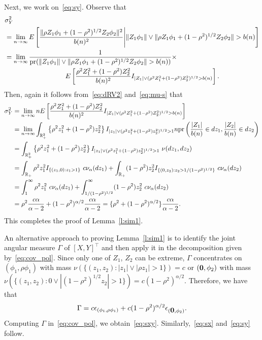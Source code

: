 \documentclass[lineno]{biometrika}
\newcommand \ag{\alpha}
\newcommand \Gg{\Gamma}
\newcommand \ep{\epsilon}
\newcommand \sg{\sigma}
\newcommand\bzero{\mbox{\boldmath${0}$}}
\newcommand\mbR{{\mathbb R}}
\newcommand\lp{\left (}
\newcommand\rp{\right )}
\newcommand\lb{\left [}
\newcommand\rb{\right ]}
\newcommand\lbr{\left \{}
\newcommand\rbr{\right \}}
\begin{document}
Next, we work on~\eqref{eq:sy}. Observe that
\begin{align*}
&\sg_{Y}^2 \\
&= \lim_{n \to \infty} E \lb   \frac{\|\rho Z_1 \phi_1+(1-\rho^2)^{1/2} Z_2 \phi_2 \|^2}{b(n)^2}  \Bigg| \| Z_1 \phi_1 \|  \vee  \| \rho Z_1 \phi_1+(1-\rho^2)^{1/2} Z_2 \phi_2 \| > b(n)\rb  \\
&= \lim_{n \to \infty} \frac{1}{{\rm pr}(\| Z_1 \phi_1 \|  \vee  \| \rho Z_1 \phi_1+(1-\rho^2)^{1/2} Z_2 \phi_2 \| > b(n))} \times \\
&\ \ \ \ \ \ \ \ \ \ \ \ \ \ \ \ \ \ \ \ \ \ \ \ \ \ \ E \lb  \frac{\rho^2 Z_1^2 +(1-\rho^2) Z_2^2 }{b(n)^2} I_{|Z_1| \vee (\rho^2 Z_1^2 +(1-\rho^2)Z_2^2 )^{1/2} > b(n)} \rb.
\end{align*}
Then, again it follows from~\eqref{eq:dRV2} and~\eqref{eq:mu-s} that
\begin{align*}
\sg_{Y}^2 &= \lim_{n \to \infty} nE \lb  \frac{\rho^2 Z_1^2 +(1-\rho^2) Z_2^2 }{b(n)^2} I_{|Z_1| \vee (\rho^2 Z_1^2 +(1-\rho^2)Z_2^2 )^{1/2} > b(n)} \rb   \\
&= \lim_{n \to \infty} \int_{\mbR^2_+} \lbr \rho^2 z_1^2 + (1-\rho^2)z_2^2 \rbr I_{ |z_1| \vee ( \rho^2 z_1^2 + (1-\rho^2) z_2^2 )^{1/2} >1} n{\rm pr}\lp \frac{|Z_1|}{b(n)} \in dz_1, \frac{|Z_2|}{b(n)}\in dz_2 \rp \\
&= \int_{\mbR_+^2}  \lbr \rho^2 z_1^2 + (1-\rho^2)z_2^2 \rbr I_{ |z_1| \vee ( \rho^2 z_1^2 + (1-\rho^2) z_2^2 )^{1/2} >1} \ \nu(dz_1, dz_2) \\
& = \int_{\mbR_+}  \rho^2 z_1^2 I_{ \{(z_1, 0): z_1>1\} } \ c\nu_{\ag}(dz_1) + \int_{\mbR_+}  (1-\rho^2)z_2^2 I_{ \{(0, z_2): z_2>1/(1-\rho^2)^{1/2} \}} \ c\nu_{\ag}(dz_2) \\
&= \int_{1}^{\infty}  \rho^2 z_1^2 \ c\nu_{\alpha}(dz_1) + \int_{1/(1-\rho^2)^{1/2}}^{\infty}   (1-\rho^2)z_2^2 \ c\nu_{\alpha}(dz_2) \\
&= \rho^2\frac{c\ag}{\ag-2} + (1-\rho^2)^{\ag/2}\frac{c\ag}{\ag-2} = \{\rho^2+(1-\rho^2)^{\ag/2}\}\frac{c\ag}{\ag-2}.
\end{align*}
This completes the proof of Lemma~\ref{l:sim1}.

An alternative approach to proving Lemma~\ref{l:sim1} is to identify the joint angular measure $\Gg$ of $[X,Y]^{\top}$ and then apply it in the decomposition given by~\eqref{eq:cov_pol}. Since only one of $Z_1$, $Z_2$ can be extreme, $\Gg$ concentrates on $(\phi_1, \rho\phi_1)$ with mass $\nu(\{(z_1, z_2) : |z_1| \vee |\rho z_1| >1\})=c$ or $(\bzero, \phi_2)$ with mass $\nu(\{(z_1, z_2) : 0 \vee |(1-\rho^2)^{1/2} z_2| >1\})=c (1-\rho^2)^{\ag/2}$. Therefore, we have that
\[
\Gg = c \ep_{(\phi_1, \rho\phi_1)} + c (1-\rho^2)^{\ag/2} \ep_{(\bzero, \phi_2)}.
\]
Computing $\Gg$ in~\eqref{eq:cov_pol}, we obtain~\eqref{eq:sxy}. Similarly,~\eqref{eq:sx} and~\eqref{eq:sy} follow.
\end{document}

